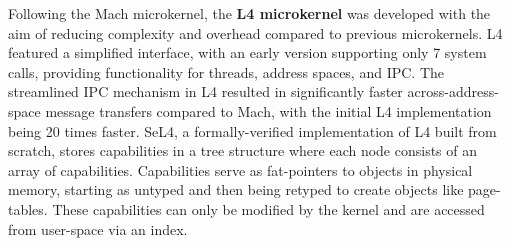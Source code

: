 Following the Mach microkernel, the \textbf{L4 microkernel} was developed with the aim of reducing complexity and 
overhead compared to previous microkernels. L4 featured a simplified interface, with an early version 
supporting only 7 system calls, providing functionality for threads, address spaces, and IPC. 
The streamlined IPC mechanism in L4 resulted in significantly faster across-address-space message transfers 
compared to Mach, with the initial L4 implementation being 20 times faster. SeL4, a formally-verified 
implementation of L4 built from scratch, stores capabilities in a tree structure where each node consists 
of an array of capabilities. Capabilities serve as fat-pointers to objects in physical memory, starting 
as untyped and then being retyped to create objects like page-tables. These capabilities can only be modified 
by the kernel and are accessed from user-space via an index.
\newline



